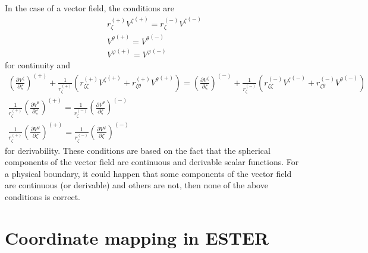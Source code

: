 In the case of a vector field, the conditions are
\begin{equation}
\begin{array}{c}
\displaystyle r_\zeta^{(+)} {V^\zeta}^{(+)}=r_\zeta^{(-)} {V^\zeta}^{(-)} \\
\displaystyle {V^\theta}^{(+)}={V^\theta}^{(-)} \\
\displaystyle {V^\varphi}^{(+)}={V^\varphi}^{(-)} 
\end{array}
\end{equation}
for continuity and
\begin{equation}
\begin{array}{c}
\displaystyle \left(\frac{\partial V^{\zeta}}{\partial\zeta}\right)^{(+)}
+\frac{1}{r_\zeta^{(+)}}\left(r_{\zeta\zeta}^{(+)}{V^\zeta}^{(+)}+r_{\zeta\theta}^{(+)}{V^\theta}^{(+)}\right)=
\left(\frac{\partial V^{\zeta}}{\partial\zeta}\right)^{(-)}
+\frac{1}{r_\zeta^{(-)}}\left(r_{\zeta\zeta}^{(-)}{V^\zeta}^{(-)}+r_{\zeta\theta}^{(-)}{V^\theta}^{(-)}\right) \\
\displaystyle \frac{1}{r_\zeta^{(+)}}\left(\frac{\partial V^{\theta}}{\partial\zeta}\right)^{(+)}= 
\frac{1}{r_\zeta^{(-)}}\left(\frac{\partial V^{\theta}}{\partial\zeta}\right)^{(-)} \\
\displaystyle \frac{1}{r_\zeta^{(+)}}\left(\frac{\partial V^{\varphi}}{\partial\zeta}\right)^{(+)}= 
\frac{1}{r_\zeta^{(-)}}\left(\frac{\partial V^{\varphi}}{\partial\zeta}\right)^{(-)}
\end{array}
\end{equation}
for derivability. These conditions are based on the fact that the spherical components of the vector field
are continuous and derivable scalar functions. For a physical boundary, it could happen that 
some components of the vector
field are continuous (or derivable) and others are not, then none of the above conditions is correct.

\section{Coordinate mapping in ESTER}




